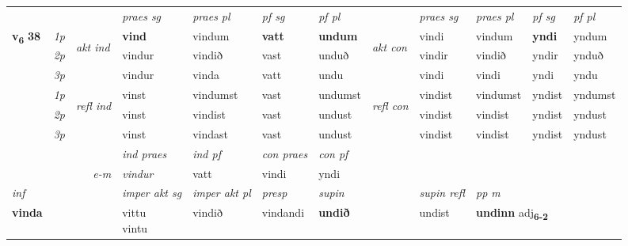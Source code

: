 \begin{longtable}[l]{X>{\footnotesize\itshape}llXXXXlXXXX}
 & &   & \textit{praes sg}  & \textit{praes pl}    & \textit{ pf sg} & \textit{pf pl} & & \textit{praes sg}  & \textit{praes pl}    & \textit{pf sg} & \textit{pf pl }  \\ \cmidrule{4-7} \cmidrule{9-12}
 \multirow{2}{*}{{{\textbf{v{\textsubscript{6}}} \Large{\textbf{38}}}}}  & 1p & \multirow{3}{*}{\begin{turn}{90}\textit{akt ind}\end{turn}} & \textbf{vind} & vindum & \textbf{vatt} & \textbf{undum} & \multirow{3}{*}{\begin{turn}{90}\textit{akt con}\end{turn}} &vindi & vindum & \textbf{yndi} & yndum\\*
 & 2p &  &  vindur  & vindið & vast & unduð & & vindir & vindið & yndir & ynduð \\*
 & 3p &  & vindur & vinda & vatt & undu & & vindi & vindi& yndi & yndu \\*
\cmidrule{4-7} \cmidrule{9-12}
 & 1p & \multirow{3}{*}{\begin{turn}{90}\textit{refl ind}\end{turn}}  & vinst & vindumst & vast & undumst & \multirow{3}{*}{\begin{turn}{90}\textit{refl con}\end{turn}}  &vindist & vindumst & yndist & yndumst \\*
 & 2p &  & vinst & vindist & vast & undust & &vindist & vindist & yndist & yndust \\*
 & 3p  & & vinst & vindast & vast & undust & & vindist & vindist& yndist & yndust \\*
\cmidrule{4-7} \cmidrule{9-12}

   && &  \textit{ind praes} & \textit{ind pf} & \textit{con praes} & \textit{con pf} \\*
\multicolumn{3}{r}{\textit{e-m}} & vindur & vatt & vindi & yndi \\*

\cmidrule{4-7}
   {\textit{inf}} & &  & \textit{imper akt sg} & \textit{imper akt pl}   & \textit{presp} & \textit{supin} && \textit{supin refl} & \textit{pp m} \\*
  {\textbf{vinda}} & && \specialcell{vittu\\ vintu}  & vindið   & vindandi &  \textbf{undið} && undist & \multicolumn{2}{l}{\textbf{undinn} adj\textbf{\textsubscript{6-2}}} \\*

\midrule


\end{longtable}
